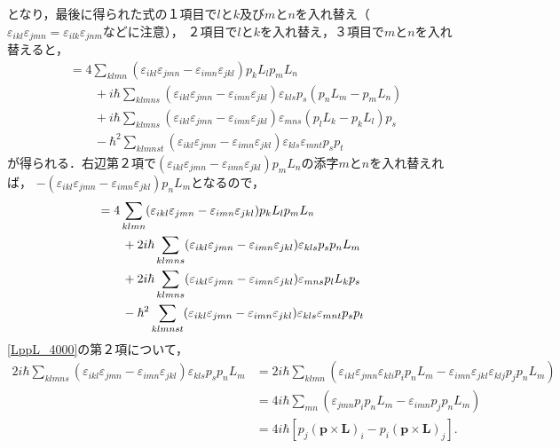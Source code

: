 となり，最後に得られた式の１項目で$l$と$k$及び$m$と$n$を入れ替え（$\varepsilon_{ikl}\varepsilon_{jmn}=\varepsilon_{ilk}\varepsilon_{jnm}$などに注意），
２項目で$l$と$k$を入れ替え，３項目で$m$と$n$を入れ替えると，
\begin{align*}
  [(\boldsymbol{L}\times\boldsymbol{p} - \boldsymbol{p}\times\boldsymbol{L})_i,(\boldsymbol{L}\times\boldsymbol{p} - \boldsymbol{p}\times\boldsymbol{L})_j]
  & = 4\sum_{klmn}(\varepsilon_{ikl}\varepsilon_{jmn} - \varepsilon_{imn}\varepsilon_{jkl})p_kL_lp_mL_n\\
  & \qquad  + i\hbar\sum_{klmns}(\varepsilon_{ikl}\varepsilon_{jmn} - \varepsilon_{imn}\varepsilon_{jkl})\varepsilon_{kls}p_s(p_nL_m - p_mL_n)\\
  & \qquad  + i\hbar\sum_{klmns}(\varepsilon_{ikl}\varepsilon_{jmn} - \varepsilon_{imn}\varepsilon_{jkl})\varepsilon_{mns}(p_lL_k - p_kL_l)p_s\\
  & \qquad - \hbar^2\sum_{klmnst}(\varepsilon_{ikl}\varepsilon_{jmn} - \varepsilon_{imn}\varepsilon_{jkl})\varepsilon_{kls}\varepsilon_{mnt}p_sp_t
\end{align*}
が得られる．右辺第２項で$(\varepsilon_{ikl}\varepsilon_{jmn} - \varepsilon_{imn}\varepsilon_{jkl})p_mL_n$の添字$m$と$n$を入れ替えれば，
$ - (\varepsilon_{ikl}\varepsilon_{jmn} - \varepsilon_{imn}\varepsilon_{jkl})p_nL_m$となるので，
\begin{align}
  [(\boldsymbol{L}\times\boldsymbol{p} - \boldsymbol{p}\times\boldsymbol{L})_i,(\boldsymbol{L}\times\boldsymbol{p} - \boldsymbol{p}\times\boldsymbol{L})_j]
  & = 4\sum_{klmn}(\varepsilon_{ikl}\varepsilon_{jmn} - \varepsilon_{imn}\varepsilon_{jkl})p_kL_lp_mL_n\notag\\
  & \qquad  + 2i\hbar\sum_{klmns}(\varepsilon_{ikl}\varepsilon_{jmn} - \varepsilon_{imn}\varepsilon_{jkl})\varepsilon_{kls}p_sp_nL_m\notag\\
  & \qquad  + 2i\hbar\sum_{klmns}(\varepsilon_{ikl}\varepsilon_{jmn} - \varepsilon_{imn}\varepsilon_{jkl})\varepsilon_{mns}p_lL_kp_s\notag\\
  & \qquad - \hbar^2\sum_{klmnst}(\varepsilon_{ikl}\varepsilon_{jmn} - \varepsilon_{imn}\varepsilon_{jkl})\varepsilon_{kls}\varepsilon_{mnt}p_sp_t\label{LppL_4000}\\
\end{align}
\eqref{LppL_4000}の第２項について，
\begin{align*}
  2i\hbar\sum_{klmns}(\varepsilon_{ikl}\varepsilon_{jmn} - \varepsilon_{imn}\varepsilon_{jkl})\varepsilon_{kls}p_sp_nL_m
  & = 2i\hbar\sum_{klmn}(\varepsilon_{ikl}\varepsilon_{jmn}\varepsilon_{kli}p_ip_nL_m - \varepsilon_{imn}\varepsilon_{jkl}\varepsilon_{klj}p_jp_nL_m)\\
  & = 4i\hbar\sum_{mn}(\varepsilon_{jmn}p_ip_nL_m - \varepsilon_{imn}p_jp_nL_m)\\
  & = 4i\hbar[p_j(\boldsymbol{p}\times\boldsymbol{L})_i - p_i(\boldsymbol{p}\times\boldsymbol{L})_j].
\end{align*}
